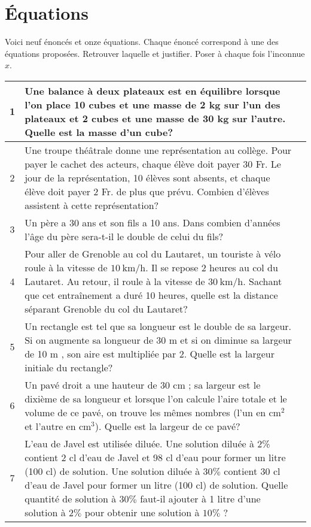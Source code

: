 \documentclass[a4paper,12pt]{article}
\begin{document}
\section{Équations}
\begin{activite}
	\tcblower
	Voici neuf énoncés et onze équations. Chaque énoncé correspond à une des équations proposées. Retrouver laquelle et justifier.
	Poser à chaque fois l'inconnue $x$.
\vspace{5pt}

\begin{tabularx}{\textwidth}{|c|X|c|}
	\hline 1 & Une balance à deux plateaux est en équilibre lorsque l'on place 10 cubes et une masse de 2 kg sur l'un des plateaux et 2 cubes et une masse de 30 kg sur l'autre. Quelle est la masse d'un cube? & \phantom{22}\\
\hline 2 & Une troupe théâtrale donne une représentation au collège. Pour payer le cachet des acteurs, chaque élève doit payer 30 Fr. Le jour de la représentation, 10 élèves sont absents, et chaque élève doit payer 2 Fr. de plus que prévu. Combien d'élèves assistent à cette représentation?& \phantom{22} \\
\hline 3 & Un père a 30 ans et son fils a 10 ans. Dans combien d'années l'âge du père sera-t-il le double de celui du fils? & \phantom{22}\\
\hline 4 & Pour aller de Grenoble au col du Lautaret, un touriste à vélo roule à la vitesse de $10 \mathrm{~km} / \mathrm{h}$. Il se repose 2 heures au col du Lautaret. Au retour, il roule à la vitesse de $30 \mathrm{~km} / \mathrm{h}$. Sachant que cet entraînement a duré 10 heures, quelle est la distance séparant Grenoble du col du Lautaret? & \phantom{22}\\
\hline 5 & Un rectangle est tel que sa longueur est le double de sa largeur. Si on augmente sa longueur de 30 m et si on diminue sa largeur de 10 m , son aire est multipliée par 2. Quelle est la largeur initiale du rectangle? & \phantom{22}\\
\hline 6 & Un pavé droit a une hauteur de 30 cm ; sa largeur est le dixième de sa longueur et lorsque l'on calcule l'aire totale et le volume de ce pavé, on trouve les mêmes nombres (l'un en $\mathrm{cm}^2$ et l'autre en $\mathrm{cm}^3$). Quelle est la largeur de ce pavé? & \phantom{22}\\
\hline 7 & L'eau de Javel est utilisée diluée. Une solution diluée à 2\% contient 2 cl d'eau de Javel et 98 cl d'eau pour former un litre (100 cl) de solution. Une solution diluée à $30 \%$ contient 30 cl d'eau de Javel pour former un litre (100 cl) de solution. Quelle quantité de solution à $30 \%$ faut-il ajouter à 1 litre d'une solution à $2 \%$ pour obtenir une solution à $10 \%$ ? & \phantom{22}\\

\end{tabularx}
\end{activite}
\end{document}

